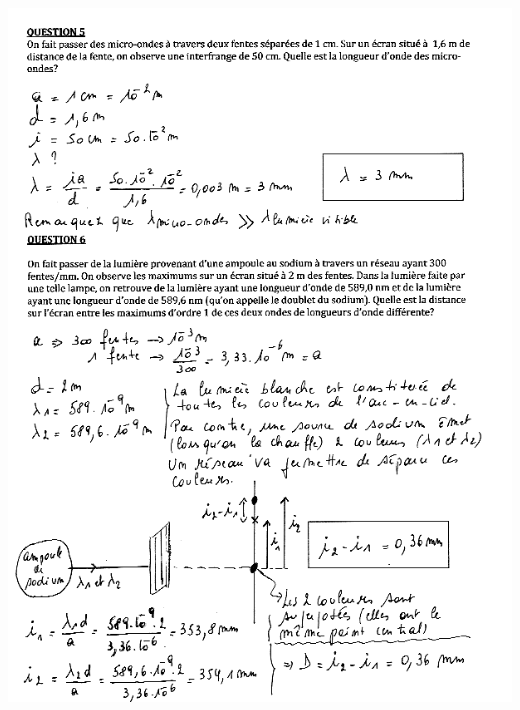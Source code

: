 \includegraphics[width=18.503cm,height=25.456cm]{Pictures/100000010000025F00000343388E3E491CC3B041.png}

